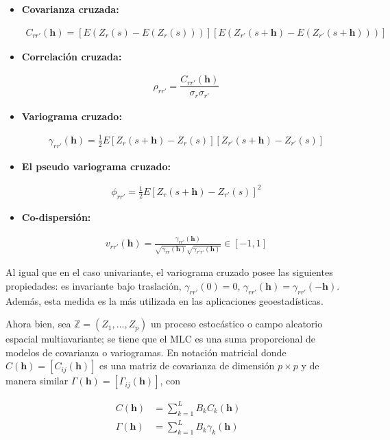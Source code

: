 \documentclass[
]{book}
\begin{document}
\begin{itemize}
\item
  \textbf{Covarianza cruzada:}

  \begin{align}
        C_{rr'}(\textbf{h})=\left[E(Z_r(s)-E(Z_r(s))) \right]\left[E(Z_{r'}(s+\textbf{h})-E(Z_{r'}(s+\textbf{h}))) \right]
    \end{align}
\item
  \textbf{Correlación cruzada:}

  \begin{align}
        \rho_{rr'}=\dfrac{C_{rr'}(\textbf{h})}{\sigma_r \sigma_{r'}}
    \end{align}
\item
  \textbf{Variograma cruzado:}

  \begin{align}
        \gamma_{rr'}(\textbf{h})=\frac{1}{2}E\left[Z_r(s+\textbf{h})-Z_r(s) \right]\left[ Z_{r'}(s+\textbf{h})-Z_{r'}(s)\right]
    \end{align}
\item
  \textbf{El pseudo variograma cruzado:}

  \begin{align}
        \phi_{rr'}=\frac{1}{2}E\left[Z_r(s+\textbf{h})-Z_{r'}(s) \right]^2
    \end{align}
\item
  \textbf{Co-dispersión:}

  \begin{align}
        v_{rr'}(\textbf{h})=\frac{\gamma_{rr'}(\textbf{h})}{\sqrt{\gamma_{rr}(\textbf{h})}\sqrt{\gamma_{r'r'}(\textbf{h})} } \in [-1,1]
    \end{align}
\end{itemize}

Al igual que en el caso univariante, el variograma cruzado posee las siguientes propiedades: es invariante bajo traslación, \(\gamma_{rr'}(0)=0\), \(\gamma_{rr'}(\textbf{h})=\gamma_{rr'}(-\textbf{h})\). Además, esta medida es la más utilizada en las aplicaciones geoestadísticas.

Ahora bien, sea \(\mathbb{Z}=(Z_1,...,Z_p)\) un proceso estocástico o campo aleatorio espacial multiavariante; se tiene que el MLC es una suma proporcional de modelos de covarianza o variogramas. En notación matricial donde \(C(\textbf{h})=[C_{ij}(\textbf{h})]\) es una matriz de covarianza de dimensión \(p\times p\) y de manera similar \(\Gamma(\textbf{h})=[\Gamma_{ij}(\textbf{h})]\), con

\begin{align}
    C(\textbf{h})&=\sum_{k=1}^{L}B_kC_k(\textbf{h})\\
    \Gamma(\textbf{h})&=\sum_{k=1}^LB_k\gamma_k(\textbf{h})
\end{align}
\end{document}

